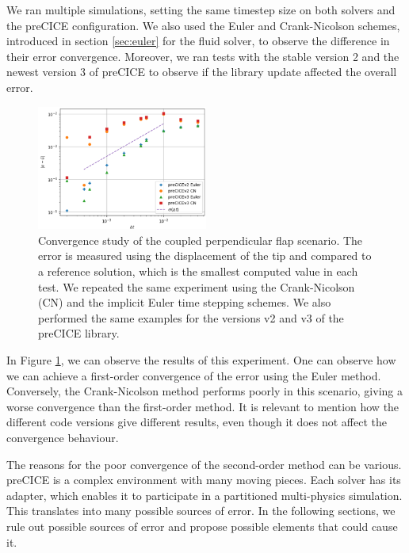 \documentclass[
  english,        %
  font=times,     %
  onecolumn,      %
]{tumarticle}
\begin{document}
We ran multiple simulations, setting the same timestep size on both solvers and the preCICE configuration. We also used the Euler and Crank-Nicolson schemes, introduced in section \ref{sec:euler} for the fluid solver, to observe the difference in their error convergence. Moreover, we ran tests with the stable version 2 and the newest version 3 of preCICE to observe if the library update affected the overall error. 
\begin{figure}[!ht]
    \centering
    \includegraphics[width=0.5\textwidth]{resources/coupled_v2_v3_results.png}
    \caption{Convergence study of the coupled perpendicular flap scenario. The error is measured using the displacement of the tip and compared to a reference solution, which is the smallest computed value in each test. We repeated the same experiment using the Crank-Nicolson (CN) and the implicit Euler time stepping schemes. We also performed the same examples for the versions v2 and v3 of the preCICE library.}
    \label{fig:coupled_v2_v3}
\end{figure}

In Figure \ref{fig:coupled_v2_v3}, we can observe the results of this experiment. One can observe how we can achieve a first-order convergence of the error using the Euler method. Conversely, the Crank-Nicolson method performs poorly in this scenario, giving a worse convergence than the first-order method. It is relevant to mention how the different code versions give different results, even though it does not affect the convergence behaviour.

The reasons for the poor convergence of the second-order method can be various. preCICE is a complex environment with many moving pieces. Each solver has its adapter, which enables it to participate in a partitioned multi-physics simulation. This translates into many possible sources of error. In the following sections, we rule out possible sources of error and propose possible elements that could cause it.
\end{document}
